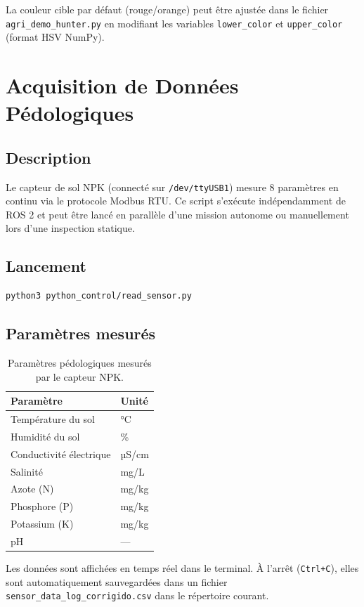 \documentclass [12pt, a4paper]{article}
\begin{document}
La couleur cible par défaut (rouge/orange) peut être ajustée dans le fichier \texttt{agri\_demo\_hunter.py} en modifiant les variables \texttt{lower\_color} et \texttt{upper\_color} (format HSV NumPy).

\section{Acquisition de Données Pédologiques}

\subsection{Description}
Le capteur de sol NPK (connecté sur \texttt{/dev/ttyUSB1}) mesure 8 paramètres en continu via le protocole Modbus RTU. Ce script s'exécute indépendamment de ROS 2 et peut être lancé en parallèle d'une mission autonome ou manuellement lors d'une inspection statique.

\subsection{Lancement}
\begin{verbatim}
python3 python_control/read_sensor.py
\end{verbatim}

\subsection{Paramètres mesurés}
\begin{table}[H]
\centering
\begin{tabular}{ll}
\toprule
\textbf{Paramètre} & \textbf{Unité} \\
\midrule
Température du sol & °C \\
Humidité du sol & \% \\
Conductivité électrique & µS/cm \\
Salinité & mg/L \\
Azote (N) & mg/kg \\
Phosphore (P) & mg/kg \\
Potassium (K) & mg/kg \\
pH & --- \\
\bottomrule
\end{tabular}
\caption{Paramètres pédologiques mesurés par le capteur NPK.}
\end{table}

Les données sont affichées en temps réel dans le terminal. À l'arrêt (\texttt{Ctrl+C}), elles sont automatiquement sauvegardées dans un fichier \texttt{sensor\_data\_log\_corrigido.csv} dans le répertoire courant.
\end{document}
